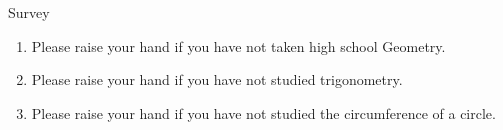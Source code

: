 \documentclass[10pt]{beamer}
\begin{document}
\begin{frame}
\end{frame}
\begin{frame}
\begin{center}
\large Survey
\end{center}
\pause
\begin{enumerate}[label = \arabic*]
\item
Please raise your hand if you have not taken high school Geometry.
\pause
{}
\item Please raise your hand if you have not studied trigonometry.
\pause
{}
\item Please raise your hand if you have not studied the circumference of a circle.
\end{enumerate}
\end{frame}
\end{document}
